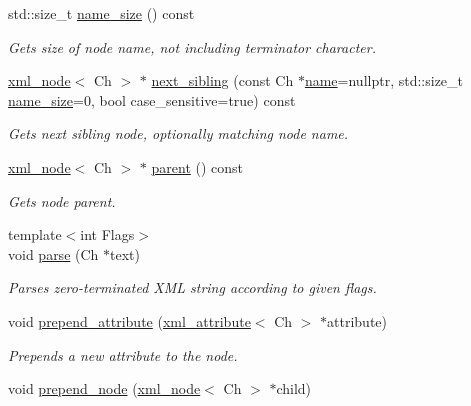 \begin{DoxyCompactItemize}
std\+::size\+\_\+t \mbox{\hyperlink{classrapidxml_1_1xml__base_ad01e2eff02202b130baad012d1ed7328}{name\+\_\+size}} () const
\begin{DoxyCompactList}\small\item\em Gets size of node name, not including terminator character. \end{DoxyCompactList}\item 
\mbox{\hyperlink{classrapidxml_1_1xml__node}{xml\+\_\+node}}$<$ Ch $>$ $\ast$ \mbox{\hyperlink{classrapidxml_1_1xml__node_a365211719a7337837a502699275c5db6}{next\+\_\+sibling}} (const Ch $\ast$\mbox{\hyperlink{classrapidxml_1_1xml__base_af8436e9ee14c127220113eaa956eafee}{name}}=nullptr, std\+::size\+\_\+t \mbox{\hyperlink{classrapidxml_1_1xml__base_ad01e2eff02202b130baad012d1ed7328}{name\+\_\+size}}=0, bool case\+\_\+sensitive=true) const
\begin{DoxyCompactList}\small\item\em Gets next sibling node, optionally matching node name. \end{DoxyCompactList}\item 
\mbox{\hyperlink{classrapidxml_1_1xml__node}{xml\+\_\+node}}$<$ Ch $>$ $\ast$ \mbox{\hyperlink{classrapidxml_1_1xml__base_a7f177e162f72f65ea1f0f0188e41c1ba}{parent}} () const
\begin{DoxyCompactList}\small\item\em Gets node parent. \end{DoxyCompactList}\item 
{\footnotesize template$<$int Flags$>$ }\\void \mbox{\hyperlink{classrapidxml_1_1xml__document_aa280fd704731128b4556b41c1e9182b8}{parse}} (Ch $\ast$text)
\begin{DoxyCompactList}\small\item\em Parses zero-\/terminated X\+ML string according to given flags. \end{DoxyCompactList}\item 
void \mbox{\hyperlink{classrapidxml_1_1xml__node_af6dffa513da74cc0be71a7ba84f8265e}{prepend\+\_\+attribute}} (\mbox{\hyperlink{classrapidxml_1_1xml__attribute}{xml\+\_\+attribute}}$<$ Ch $>$ $\ast$attribute)
\begin{DoxyCompactList}\small\item\em Prepends a new attribute to the node. \end{DoxyCompactList}\item 
void \mbox{\hyperlink{classrapidxml_1_1xml__node_a0c39df6617e709eb2fba11300dea63f2}{prepend\+\_\+node}} (\mbox{\hyperlink{classrapidxml_1_1xml__node}{xml\+\_\+node}}$<$ Ch $>$ $\ast$child)

\end{DoxyCompactItemize}

